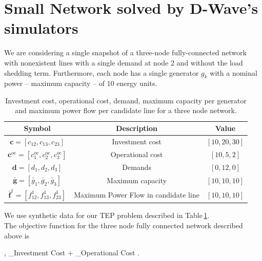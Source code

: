 \section{Small Network solved by D-Wave's simulators}
 We are considering a single snapshot of a three-node fully-connected network with nonexistent lines with a single demand at node $2$ and without the load shedding term. Furthermore, each node has a single generator $g_{k}$ with a nominal power -- maximum capacity -- of $10$ energy units.
 \begin{table}[H]
\centering
\begin{tabular}{ |c |c| c| }
  \hline			
  \textbf{Symbol} & \textbf{Description} & \textbf{Value}  \\
    \hline		
   $\mathbf{c} = \left[c_{12},c_{13},c_{23}\right]$ & Investment cost & $\left[10, 20, 30\right]$\\
       \hline		
   $\mathbf{c}^{\textrm{oc}} = \left[c_{1}^{\textrm{oc}},c_{2}^{\textrm{oc}}, c_{3}^{\textrm{oc}}\right]$ & Operational cost & $\left[10, 5, 2\right]$\\
          \hline		
   $\mathbf{d} = \left[d_{1}, d_{2}, d_{3}\right]$ & Demands & $\left[0, 12, 0\right]$\\
       \hline		
   $\mathbf{\bar{g}} = \left[\bar{g}_{1},\bar{g}_{2},\bar{g}_{3}\right]$ & Maximum capacity & $\left[10, 10, 10\right]$\\
    \hline	
    $\mathbf{\bar{f}}^{1} = \left[f_{12}^{1},f_{13}^{1},f_{23}^{1}\right]$ & Maximum Power Flow in candidate line & $\left[10, 10, 10\right]$\\
    \hline
\end{tabular}
\caption{Investment cost, operational cost, demand, maximum capacity per generator and maximum power flow per candidate line for a three node network.}
\label{tab:SmallNetwork}
\end{table}
We use synthetic data for our TEP problem described in Table\,\ref{tab:SmallNetwork}.\\
The objective function for the three node fully connected network described above is
\begin{mini!}[2]
	{, }{_{\textrm{Investment Cost}} + _{\textrm{Operational Cost}}}{}{}{}
    .
    \end{mini!}
